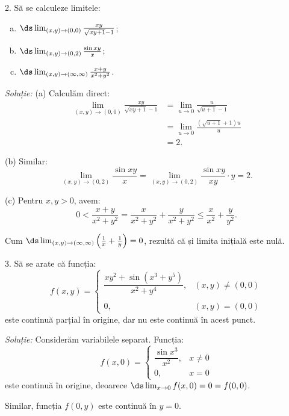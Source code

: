 \vspace{0.5cm}

2. Să se calculeze limitele:
\begin{enumerate}[(a)]
\item $\ds\lim_{(x, y) \to (0, 0)} \frac{xy}{\sqrt{xy + 1} - 1}$;
\item $\ds\lim_{(x, y) \to (0, 2)} \frac{\sin xy}{x}$;
\item $\ds\lim_{(x, y) \to (\infty, \infty)} \frac{x + y}{x^2 + y^2}$.
\end{enumerate}

\emph{Soluție:} (a) Calculăm direct:
\begin{align*}
  \lim_{(x, y) \to (0, 0)} \frac{xy}{\sqrt{xy + 1} - 1} &= \lim_{u \to 0} \frac{u}{\sqrt{u + 1} - 1} \\
                                                        &= \lim_{u \to 0} \frac{(\sqrt{u + 1} + 1)u}{u}\\
                                                        &= 2.
\end{align*}

(b) Similar:
\[
  \lim_{(x, y) \to (0, 2)} \frac{\sin xy}{x} = \lim_{(x, y) \to (0, 2)} \frac{\sin xy}{xy} \cdot y = 2.
\]

(c) Pentru $x, y > 0$, avem:
\[
  0 < \frac{x + y}{x^2 + y^2} = \frac{x}{x^2 + y^2} + \frac{y}{x^2 + y^2} \leq \frac{x}{x^2} + \frac{y}{y^2}.
\]

Cum $\ds\lim_{(x, y) \to (\infty, \infty)} \Big( \frac{1}{x} + \frac{1}{y} \Big) = 0$, rezultă
că și limita inițială este nulă.

\vspace{0.5cm}

3. Să se arate că funcția:
\[
  f(x, y) = \begin{cases}
    \dfrac{xy^2 + \sin(x^3 + y^5)}{x^2 + y^4}, & (x, y) \neq (0, 0) \\
    & \\
    0, & (x, y) = (0, 0)
  \end{cases}
\]
este continuă parțial în origine, dar nu este continuă în acest punct.

\emph{Soluție:} Considerăm variabilele separat. Funcția:
\[
  f(x, 0) = \begin{cases}
    \dfrac{\sin x^3}{x^2}, & x \neq 0 \\
    0, & x = 0
  \end{cases}
\]
este continuă în origine, deoarece $\ds\lim_{x \to 0} f(x, 0) = 0 = f(0, 0)$.

Similar, funcția $f(0, y)$ este continuă în $y = 0$.

